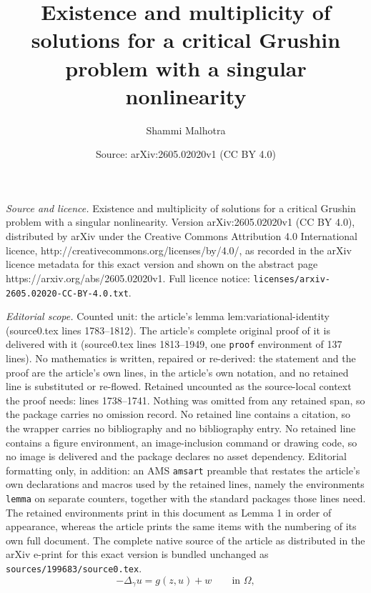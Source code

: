 \documentclass[10pt,a4paper]{amsart}
\title{Existence and multiplicity of solutions for a critical Grushin problem with a singular nonlinearity}
\author{Shammi Malhotra}
\date{Source: arXiv:2605.02020v1 (CC BY 4.0)}
\begin{document}
\maketitle

\noindent\emph{Source and licence.} Existence and multiplicity of solutions for a critical Grushin problem with a singular nonlinearity. Version arXiv:2605.02020v1 (CC BY 4.0), distributed by arXiv under the Creative Commons Attribution 4.0 International licence, http://creativecommons.org/licenses/by/4.0/, as recorded in the arXiv licence metadata for this exact version and shown on the abstract page https://arxiv.org/abs/2605.02020v1. Full licence notice: \texttt{licenses/arxiv-2605.02020-CC-BY-4.0.txt}.\par\smallskip

\noindent\textit{Editorial scope.} Counted unit: the article's lemma lem:variational-identity (source0.tex lines 1783--1812). The article's complete original proof of it is delivered with it (source0.tex lines 1813--1949, one \texttt{proof} environment of 137 lines). No mathematics is written, repaired or re-derived: the statement and the proof are the article's own lines, in the article's own notation, and no retained line is substituted or re-flowed.  Retained uncounted as the source-local context the proof needs: lines 1738--1741.  Nothing was omitted from any retained span, so the package carries no omission record.  No retained line contains a citation, so the wrapper carries no bibliography and no bibliography entry.  No retained line contains a figure environment, an image-inclusion command or drawing code, so no image is delivered and the package declares no asset dependency.  Editorial formatting only, in addition: an AMS \texttt{amsart} preamble that restates the article's own declarations and macros used by the retained lines, namely the environments \texttt{lemma} on separate counters, together with the standard packages those lines need.  The retained environments print in this document as Lemma 1 in order of appearance, whereas the article prints the same items with the numbering of its own full document.  The complete native source of the article as distributed in the arXiv e-print for this exact version is bundled unchanged as \texttt{sources/199683/source0.tex}.
\begin{equation}
\label{eq:main_eq_singular}
- \Delta_{\gamma} u = g(z,u) + w \qquad \text{in } \Omega,
\end{equation}
\end{document}
